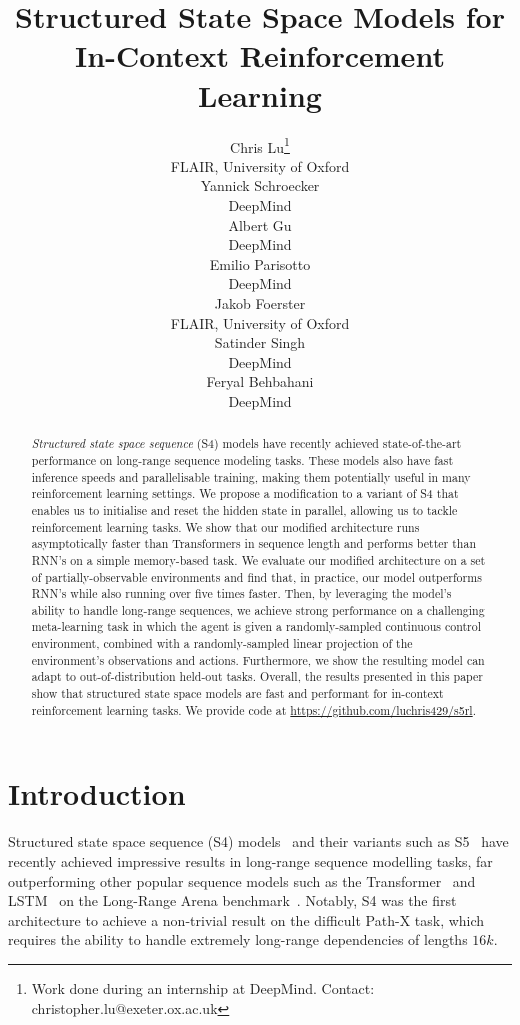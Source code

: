 \documentclass{article}
\title{Structured State Space Models for In-Context Reinforcement Learning}
\author{%
  Chris Lu\thanks{Work done during an internship at DeepMind. Contact: christopher.lu@exeter.ox.ac.uk} \\
  FLAIR, University of Oxford\\
  \And
  Yannick Schroecker \\
  DeepMind \\
  \And
  Albert Gu \\
  DeepMind \\
  \And
  Emilio Parisotto \\
  DeepMind \\
  \And
  Jakob Foerster \\
  FLAIR, University of Oxford \\
  \And
  Satinder Singh \\
  DeepMind \\
  \And
  Feryal Behbahani \\
  DeepMind \\
}
\begin{document}
\maketitle


\begin{abstract}
 \textit{Structured state space sequence} (S4) models have recently achieved state-of-the-art performance on long-range sequence modeling tasks. These models also have fast inference speeds and parallelisable training, making them potentially useful in many reinforcement learning settings. We propose a  modification to a variant of S4 that enables us to initialise and reset the hidden state in parallel, allowing us to tackle reinforcement learning tasks. We show that our modified architecture runs asymptotically faster than Transformers in sequence length and performs better than RNN's on a simple memory-based task. We evaluate our modified architecture on a set of partially-observable environments and find that, in practice, our model outperforms RNN's while also running over five times faster. Then, by leveraging the model’s ability to handle long-range sequences, we achieve strong performance on a challenging meta-learning task in which the agent is given a randomly-sampled continuous control environment, combined with a randomly-sampled linear projection of the environment's observations and actions. Furthermore, we show the resulting model can adapt to out-of-distribution held-out tasks. Overall, the results presented in this paper show that structured state space models are fast and performant for in-context reinforcement learning tasks. We provide code at \url{https://github.com/luchris429/s5rl}.
\end{abstract}

\section{Introduction}
\label{sec:Introduction}

Structured state space sequence (S4) models~\citep{gu2021efficiently} and their variants such as S5~\citep{smith2022simplified} have recently achieved impressive results in long-range sequence modelling tasks, far outperforming other popular sequence models such as the Transformer~\citep{vaswani2017attention} and LSTM~\citep{hochreiter1997long} on the Long-Range Arena benchmark~\citep{tay2020long}. Notably, S4 was the first architecture to achieve a non-trivial result on the difficult Path-X task, which requires the ability to handle extremely long-range dependencies of lengths $16k$.
\end{document}
